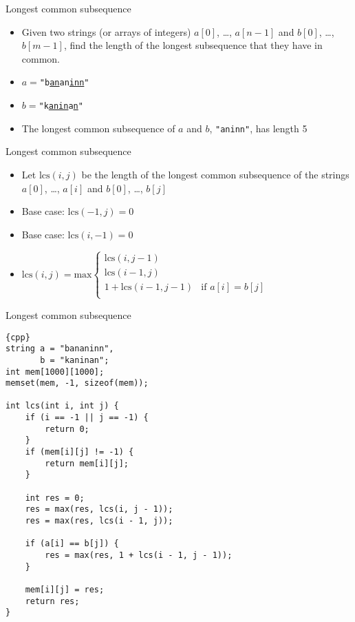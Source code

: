 \begin{frame}[fragile]{Longest common subsequence}
    \begin{itemize}
\item Given two strings (or arrays of integers) $a[0]$, \ldots, $a[n-1]$ and $b[0]$, \ldots, $b[m-1]$, find the length of the longest subsequence that they have in common.
\item $a = $\texttt{"b\underline{an}an\underline{inn}"}
\item $b = $\texttt{"k\underline{anin}a\underline{n}"}
\item The longest common subsequence of $a$ and $b$, \texttt{"aninn"}, has length 5
    \end{itemize}
\end{frame}

\begin{frame}[fragile]{Longest common subsequence}
    \begin{itemize}
\item Let $\mathrm{lcs}(i, j)$ be the length of the longest common subsequence of the strings $a[0]$, \ldots, $a[i]$ and $b[0]$, \ldots, $b[j]$
\item Base case: $\mathrm{lcs}(-1, j) = 0$
\item Base case: $\mathrm{lcs}(i, -1) = 0$
\item $\mathrm{lcs}(i, j) = \mathrm{max} \left\{
	\begin{array}{ll}
        \mathrm{lcs}(i,j-1) & \\
        \mathrm{lcs}(i-1,j) & \\
        1 + \mathrm{lcs}(i-1,j-1) & \textrm{if } a[i] = b[j] \\
	\end{array}
\right.$
    \end{itemize}
\end{frame}

\begin{frame}[fragile]{Longest common subsequence}
    \begin{lstlisting}[basicstyle=\scriptsize]{cpp}
string a = "bananinn",
       b = "kaninan";
int mem[1000][1000];
memset(mem, -1, sizeof(mem));

int lcs(int i, int j) {
    if (i == -1 || j == -1) {
        return 0;
    }
    if (mem[i][j] != -1) {
        return mem[i][j];
    }

    int res = 0;
    res = max(res, lcs(i, j - 1));
    res = max(res, lcs(i - 1, j));

    if (a[i] == b[j]) {
        res = max(res, 1 + lcs(i - 1, j - 1));
    }

    mem[i][j] = res;
    return res;
}
    \end{lstlisting}
\end{frame}

